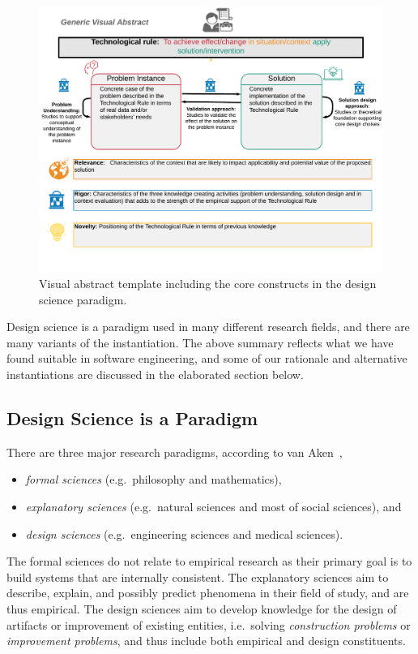 \documentclass[graybox]{svmult}
\newcommand{\emelie}[1]{\textcolor{red}{{\it [Emelie says: #1]}}}
\newcommand{\per}[1]{\textcolor{cyan}{{\it [Per says: #1]}}}
\newcommand{\emelie}[1]{}
\newcommand{\per}[1]{}
\begin{document}
\begin{figure}
  \includegraphics[width=1.0\textwidth]{Figures/GenericVA.png}
\caption{Visual abstract template including the core constructs in the design science paradigm.}
\label{fig:VA-template}       %
\end{figure}


Design science is a paradigm used in many different research fields, and there are many variants of the instantiation. The above summary reflects what we have found suitable in software engineering, and some of our rationale and alternative instantiations are discussed in the elaborated section below.


\subsection{Design Science is a Paradigm}
There are three major research paradigms, according to van Aken~\cite{van_aken_management_2004}, 
\begin{itemize}
\item \emph{formal sciences} (e.g.\ philosophy and mathematics), 
\item \emph{explanatory sciences} (e.g.\ natural sciences and most of social sciences), and 
\item \emph{design sciences} (e.g.\ engineering sciences and medical sciences).  
\end{itemize}
The formal sciences do not relate to empirical research as their primary goal is to build systems that are internally consistent. The explanatory sciences aim to describe, explain, and possibly predict phenomena in their field of study, and are thus empirical. The design sciences aim to develop knowledge for the design of artifacts or improvement of existing entities, i.e.\ solving \emph{construction problems} or  \emph{improvement problems}, and thus include both empirical and design constituents. 
\end{document}
